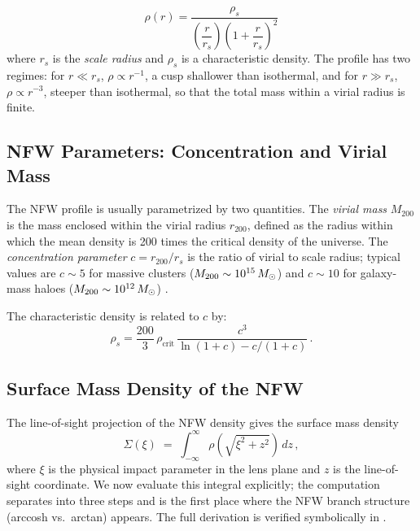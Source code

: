 \begin{equation}
    \boxed{
    \rho(r) = \frac{\rho_s}{\left(\dfrac{r}{r_s}\right)
    \left(1 + \dfrac{r}{r_s}\right)^2}
    }
    \label{eq:nfw_rho}
\end{equation}
where $r_s$ is the \emph{scale radius} and $\rho_s$ is a
characteristic density.  The profile has two regimes: for
$r \ll r_s$, $\rho \propto r^{-1}$, a cusp shallower than isothermal,
and for $r \gg r_s$, $\rho \propto r^{-3}$, steeper than isothermal,
so that the total mass within a virial radius is finite.

\subsection{NFW Parameters: Concentration and Virial Mass}

The NFW profile is usually parametrized by two quantities.  The
\emph{virial mass} $M_{200}$ is the mass enclosed within the virial
radius $r_{200}$, defined as the radius within which the mean density
is 200 times the critical density of the universe.  The
\emph{concentration parameter} $c = r_{200}/r_s$ is the ratio of
virial to scale radius; typical values are $c \sim 5$ for massive
clusters ($M_{200} \sim 10^{15}\,M_{\odot}$) and $c \sim 10$ for
galaxy-mass haloes ($M_{200} \sim 10^{12}\,M_{\odot}$)
\citep[][Part~2, p.~128]{schneider_kochanek_wambsganss_2006}.

The characteristic density is related to $c$ by:
\begin{equation}
    \rho_s = \frac{200}{3}\,\rho_{\mathrm{crit}}\,
    \frac{c^3}{\ln(1+c) - c/(1+c)} \,.
    \label{eq:nfw_rho_s}
\end{equation}

\subsection{Surface Mass Density of the NFW}
\label{sec:nfw_sigma}

The line-of-sight projection of the NFW density gives the surface mass
density
\begin{equation}
    \Sigma(\xi) \;=\; \int_{-\infty}^{\infty}
        \rho\!\left(\sqrt{\xi^2 + z^2}\right)\,dz \,,
    \label{eq:nfw_sigma_setup}
\end{equation}
where $\xi$ is the physical impact parameter in the lens plane and $z$
is the line-of-sight coordinate.  We now evaluate this integral
explicitly; the computation separates into three steps and is
the first place where the NFW branch structure
(arccosh vs.\ arctan) appears.  The full derivation is verified
symbolically in
.

